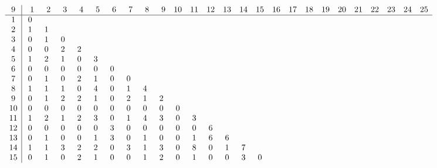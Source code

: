 \begin{landscape}
\[
\begin{array}{c|ccccccccccccccccccccccccc}\addcontentsline{lot}{table}{\protect\numberline{}Dimensions of the Kernel of $\mathcal{L}_{r,c,9}$}
 9&  \phantom{0}1&  \phantom{0}2&  \phantom{0}3&  \phantom{0}4&  \phantom{0}5&  \phantom{0}6&  \phantom{0}7&  \phantom{0}8&  \phantom{0}9& 10& 11& 12& 13& 14& 15& 16& 17& 18& 19& 20& 21& 22& 23& 24& 25\\
\hline
 1&  0&   &   &   &   &   &   &   &   &   &   &   &   &   &   &   &   &   &   &   &   &   &   &   &   \\
 2&  1&  1&   &   &   &   &   &   &   &   &   &   &   &   &   &   &   &   &   &   &   &   &   &   &   \\
 3&  0&  1&  0&   &   &   &   &   &   &   &   &   &   &   &   &   &   &   &   &   &   &   &   &   &   \\
 4&  0&  0&  2&  2&   &   &   &   &   &   &   &   &   &   &   &   &   &   &   &   &   &   &   &   &   \\
 5&  1&  2&  1&  0&  3&   &   &   &   &   &   &   &   &   &   &   &   &   &   &   &   &   &   &   &   \\
 6&  0&  0&  0&  0&  0&  0&   &   &   &   &   &   &   &   &   &   &   &   &   &   &   &   &   &   &   \\
 7&  0&  1&  0&  2&  1&  0&  0&   &   &   &   &   &   &   &   &   &   &   &   &   &   &   &   &   &   \\
 8&  1&  1&  1&  0&  4&  0&  1&  4&   &   &   &   &   &   &   &   &   &   &   &   &   &   &   &   &   \\
 9&  0&  1&  2&  2&  1&  0&  2&  1&  2&   &   &   &   &   &   &   &   &   &   &   &   &   &   &   &   \\
10&  0&  0&  0&  0&  0&  0&  0&  0&  0&  0&   &   &   &   &   &   &   &   &   &   &   &   &   &   &   \\
11&  1&  2&  1&  2&  3&  0&  1&  4&  3&  0&  3&   &   &   &   &   &   &   &   &   &   &   &   &   &   \\
12&  0&  0&  0&  0&  0&  3&  0&  0&  0&  0&  0&  6&   &   &   &   &   &   &   &   &   &   &   &   &   \\
13&  0&  1&  0&  0&  1&  3&  0&  1&  0&  0&  1&  6&  6&   &   &   &   &   &   &   &   &   &   &   &   \\
14&  1&  1&  3&  2&  2&  0&  3&  1&  3&  0&  8&  0&  1&  7&   &   &   &   &   &   &   &   &   &   &   \\
15&  0&  1&  0&  2&  1&  0&  0&  1&  2&  0&  1&  0&  0&  3&  0&   &   &   &   &   &   &   &   &   &   \\

\end{array}\]
\end{landscape}
